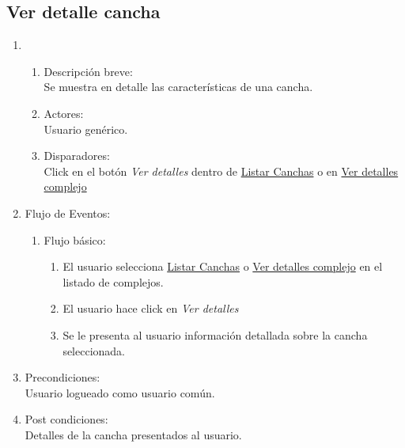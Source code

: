 \documentclass[a4paper,11pt]{article}
\begin{document}
\subsection{Ver detalle cancha}
\begin{enumerate}

    \item
    \begin{enumerate}
    \item Descripci\'on breve: \\
        Se muestra en detalle las caracter\'isticas de una cancha.
    \item Actores: \\
        Usuario gen\'erico.
    \item Disparadores: \\
        Click en el bot\'on \emph{Ver detalles} dentro de \underline{Listar Canchas} o en \underline{Ver detalles complejo}
    \end{enumerate}

    \item Flujo de Eventos:
    \begin{enumerate}
        \item Flujo b\'asico:
        \begin{enumerate}
            \item El usuario selecciona \underline{Listar Canchas}
                o \underline{Ver detalles complejo} en el listado de complejos.
            \item El usuario hace click en \emph{Ver detalles}
            \item Se le presenta al usuario informaci\'on detallada sobre la cancha seleccionada.
        \end{enumerate}
    \end{enumerate}

    \item Precondiciones: \\
        Usuario logueado como usuario com\'un.
    \item Post condiciones: \\
        Detalles de la cancha presentados al usuario.

\end{enumerate}


\end{document}
